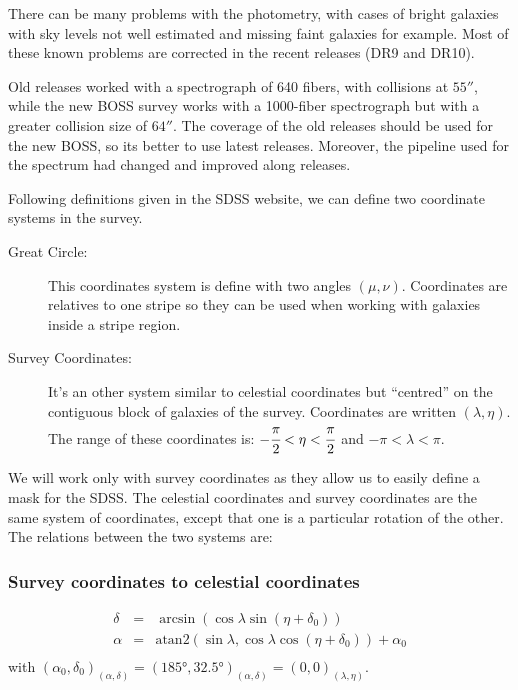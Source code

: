 There can be many problems with the photometry, with cases of bright galaxies
with sky levels not well estimated and missing faint galaxies for example. Most
of these known problems are corrected in the recent releases (DR9 and DR10).

Old releases worked with a spectrograph of 640 fibers, with collisions at
$55''$, while the new BOSS survey works with a 1000-fiber spectrograph but with a
greater collision size of $64''$. The coverage of the old releases should be
used for the new BOSS, so its better to use latest releases. Moreover, the
pipeline used for the spectrum had changed and improved along releases.

Following definitions given in the SDSS website, we can define two
coordinate systems in the survey.
%
\begin{description}
    \item[Great Circle:] This coordinates system is define with two angles
        $(\mu, \nu)$. Coordinates are relatives to one stripe so they can be
        used when working with galaxies inside a stripe region.

    \item[Survey Coordinates:] It's an other system similar to celestial
        coordinates but ``centred'' on the contiguous block of galaxies  of
        the survey. Coordinates are written $(\lambda, \eta)$. The range of
        these coordinates is: $-\cfrac{\pi}{2}<\eta<\cfrac{\pi}{2}$ and
        $-\pi<\lambda<\pi$.
\end{description}
%
We will work only with survey coordinates as they allow us to easily define
a mask for the SDSS\@. The celestial coordinates and survey coordinates are
the same system of coordinates, except that one is a particular rotation of
the other. The relations between the two systems are:

\subsubsection{Survey coordinates to celestial coordinates}

\begin{eqnarray}
    \delta &=&
        \arcsin\left(\cos\lambda\sin\left(\eta+\delta_0\right)\right)
        \nonumber\\
    \alpha &=&
        \mathrm{atan2}
        \left(\sin\lambda,\cos\lambda\cos\left(\eta+\delta_0\right)\right)+
        \alpha_0\nonumber\\
\end{eqnarray}
%
with ${\left(\alpha_0,\delta_0\right)}_{\left(\alpha,\delta\right)}=
{\left(185°,32.5°\right)}_{\left(\alpha,\delta\right)}=
{\left(0,0\right)}_{\left(\lambda, \eta\right)}$.

